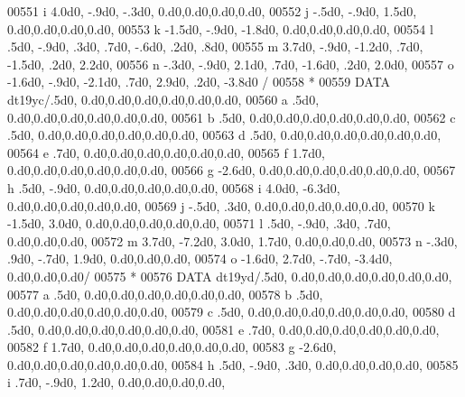 \begin{DoxyCode}
00551      i           4.0d0,  -.9d0,  -.3d0,             0.d0,0.d0,0.d0,0.d0,
00552      j           -.5d0,  -.9d0,  1.5d0,             0.d0,0.d0,0.d0,0.d0,
00553      k          -1.5d0,  -.9d0, -1.8d0,             0.d0,0.d0,0.d0,0.d0,
00554      l            .5d0,  -.9d0,   .3d0,   .7d0,  -.6d0,   .2d0,   .8d0,
00555      m           3.7d0,  -.9d0, -1.2d0,   .7d0, -1.5d0,   .2d0,  2.2d0,
00556      n           -.3d0,  -.9d0,  2.1d0,   .7d0, -1.6d0,   .2d0,  2.0d0,
00557      o          -1.6d0,  -.9d0, -2.1d0,   .7d0,  2.9d0,   .2d0, -3.8d0 /
00558 \textcolor{comment}{*}
00559       \textcolor{keyword}{DATA} dt19yc/.5d0,                  0.d0,0.d0,0.d0,0.d0,0.d0,0.d0,
00560      a            .5d0,                  0.d0,0.d0,0.d0,0.d0,0.d0,0.d0,
00561      b            .5d0,                  0.d0,0.d0,0.d0,0.d0,0.d0,0.d0,
00562      c            .5d0,                  0.d0,0.d0,0.d0,0.d0,0.d0,0.d0,
00563      d            .5d0,                  0.d0,0.d0,0.d0,0.d0,0.d0,0.d0,
00564      e            .7d0,                  0.d0,0.d0,0.d0,0.d0,0.d0,0.d0,
00565      f           1.7d0,                  0.d0,0.d0,0.d0,0.d0,0.d0,0.d0,
00566      g          -2.6d0,                  0.d0,0.d0,0.d0,0.d0,0.d0,0.d0,
00567      h            .5d0,  -.9d0,             0.d0,0.d0,0.d0,0.d0,0.d0,
00568      i           4.0d0, -6.3d0,             0.d0,0.d0,0.d0,0.d0,0.d0,
00569      j           -.5d0,   .3d0,             0.d0,0.d0,0.d0,0.d0,0.d0,
00570      k          -1.5d0,  3.0d0,             0.d0,0.d0,0.d0,0.d0,0.d0,
00571      l            .5d0,  -.9d0,   .3d0,   .7d0,          0.d0,0.d0,0.d0,
00572      m           3.7d0, -7.2d0,  3.0d0,  1.7d0,          0.d0,0.d0,0.d0,
00573      n           -.3d0,   .9d0,  -.7d0,  1.9d0,          0.d0,0.d0,0.d0,
00574      o          -1.6d0,  2.7d0,  -.7d0, -3.4d0,          0.d0,0.d0,0.d0/
00575 \textcolor{comment}{*}
00576       \textcolor{keyword}{DATA} dt19yd/.5d0,                  0.d0,0.d0,0.d0,0.d0,0.d0,0.d0,
00577      a            .5d0,                  0.d0,0.d0,0.d0,0.d0,0.d0,0.d0,
00578      b            .5d0,                  0.d0,0.d0,0.d0,0.d0,0.d0,0.d0,
00579      c            .5d0,                  0.d0,0.d0,0.d0,0.d0,0.d0,0.d0,
00580      d            .5d0,                  0.d0,0.d0,0.d0,0.d0,0.d0,0.d0,
00581      e            .7d0,                  0.d0,0.d0,0.d0,0.d0,0.d0,0.d0,
00582      f           1.7d0,                  0.d0,0.d0,0.d0,0.d0,0.d0,0.d0,
00583      g          -2.6d0,                  0.d0,0.d0,0.d0,0.d0,0.d0,0.d0,
00584      h            .5d0,  -.9d0,   .3d0,             0.d0,0.d0,0.d0,0.d0,
00585      i            .7d0,  -.9d0,  1.2d0,             0.d0,0.d0,0.d0,0.d0,

\end{DoxyCode}
